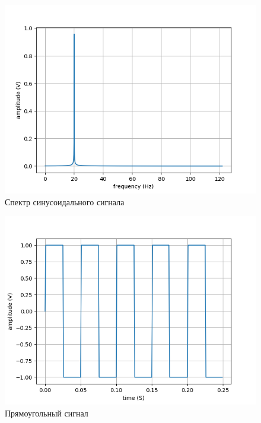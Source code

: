 \begin{figure}[H]
	\begin{center}
		\includegraphics[scale=0.7]{../../lab1/out/sine_freq.png}
		\caption{Спектр синусоидального сигнала} 
		\label{pic:sine_freq} %
	\end{center}
\end{figure}

\begin{figure}[H]
	\begin{center}
		\includegraphics[scale=0.7]{../../lab1/out/square_time.png}
		\caption{Прямоугольный сигнал} 
		\label{pic:square_time} %
	\end{center}
\end{figure}

